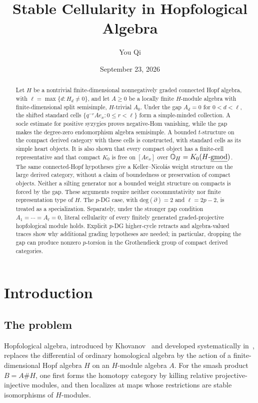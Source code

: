 \documentclass[11pt]{article}
\title{Stable Cellularity in Hopfological Algebra}
\author{You Qi}
\date{September 23, 2026}
\theoremstyle{definition}
\numberwithin{equation}{section}
\def\udgmod{\mbox{-\underline{gmod}}}
\begin{document}
\maketitle\thispagestyle{empty}

\begin{abstract}
Let $H$ be a nontrivial finite-dimensional nonnegatively graded connected
Hopf algebra, with $\ell=\max\{d:H_d\ne0\}$, and let $A\ge0$ be a
locally finite $H$-module algebra with finite-dimensional split semisimple,
$H$-trivial $A_0$.  Under the gap $A_d=0$ for $0<d<\ell$, the shifted
standard cells $\{q^{-r}Ae_x:0\le r<\ell\}$ form a simple-minded collection.
A socle estimate for positive syzygies proves negative-Hom vanishing,
while the gap makes the degree-zero endomorphism algebra semisimple.
A bounded $t$-structure on the compact derived
category with these cells is constructed, with standard cells as its simple heart objects.  It is also shown
that every compact object has a finite-cell representative and that
compact $K_0$ is free on $[Ae_x]$ over $\mathbb O_H=K_0(H\udgmod)$.
The same connected-Hopf hypotheses give a Keller--Nicol\'as weight
structure on the large derived category, without a claim of boundedness
or preservation of compact objects.  Neither a silting generator nor a
bounded weight structure on compacts is forced by the gap.
These arguments require neither cocommutativity nor finite representation
type of $H$.  The $p$-DG case, with $\mathrm{deg}(\partial)=2$ and $\ell=2p-2$,
is treated as a specialization.
Separately, under the stronger gap condition
$A_1=\cdots=A_\ell=0$, literal cellularity of every finitely generated
graded-projective hopfological module holds.  Explicit $p$-DG higher-cycle
retracts and algebra-valued traces show why additional grading hypotheses
are needed; in particular, dropping the gap can produce nonzero
$p$-torsion in the Grothendieck group of compact derived categories.
\end{abstract}

\tableofcontents

\section{Introduction}
\label{sec:introduction}

\subsection{The problem}
Hopfological algebra, introduced by Khovanov~\cite{Hopforoots} and developed
systematically in~\cite{QYHopf}, replaces the differential of ordinary
homological algebra by the action of a finite-dimensional Hopf algebra $H$
on an $H$-module algebra $A$.  For the smash product $B=A\#H$, one first
forms the homotopy category by killing relative projective-injective
modules, and then localizes at maps whose restrictions are stable
isomorphisms of $H$-modules.
\end{document}
